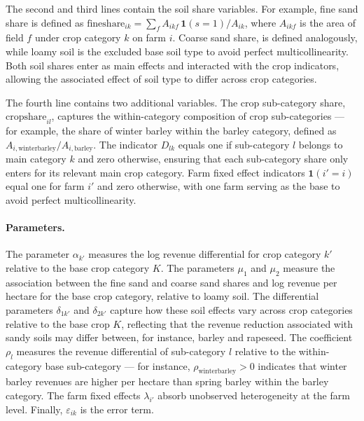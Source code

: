 \documentclass[12pt]{article}
\begin{document}
The second and third lines contain the soil share variables. For example, fine sand share is defined as $\text{fineshare}_{ik} = \sum_f A_{ikf}\,\mathbf{1}(s=1) / A_{ik}$,
where $A_{ikf}$ is the area of field $f$ under crop category $k$ on
farm $i$. 
Coarse sand share, is defined analogously, while loamy soil is the excluded base soil type to avoid perfect multicollinearity.
Both soil shares enter as main effects and interacted with the
crop indicators, allowing the associated effect of soil type to
differ across crop categories.

The fourth line contains two additional variables.
The crop sub-category share, $\text{cropshare}_{il}$, captures the
within-category composition of crop sub-categories --- for example,
the share of winter barley within the barley category, defined as
$A_{i,\text{winterbarley}} / A_{i,\text{barley}}$.
The indicator $D_{lk}$ equals one if sub-category $l$ belongs to main
category $k$ and zero otherwise, ensuring that each sub-category share
only enters for its relevant main crop category.
Farm fixed effect indicators $\mathbf{1}(i'=i)$ equal one for farm
$i'$ and zero otherwise, with one farm serving as the base to avoid
perfect multicollinearity.

\paragraph{Parameters.}
The parameter $\alpha_{k'}$ measures the log revenue differential for crop category $k'$ relative to the base crop category $K$.
The parameters $\mu_1$ and $\mu_2$ measure the association between the fine sand and coarse sand shares and log revenue per hectare for the base crop category, relative to loamy soil.
The differential parameters $\delta_{1k'}$ and $\delta_{2k'}$ capture how these soil effects vary across crop categories relative to the base crop $K$, reflecting that the revenue reduction associated with sandy soils may differ between, for instance, barley and rapeseed.
The coefficient $\rho_l$ measures the revenue differential of sub-category $l$ relative to the within-category base sub-category --- for instance, $\rho_{\text{winterbarley}} > 0$ indicates that winter barley revenues are higher per hectare than spring barley within the barley category.
The farm fixed effects $\lambda_{i'}$ absorb unobserved heterogeneity at the farm level.
Finally, $\varepsilon_{ik}$ is the error term.
\end{document}
